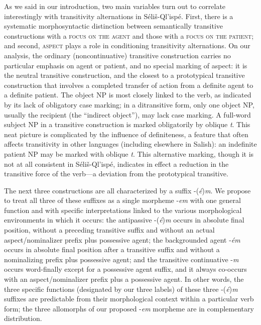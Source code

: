\documentclass[output=paper,colorlinks,citecolor=brown]{langscibook}
\begin{document}
As we said in our introduction, two main variables turn out to
correlate interestingly with transitivity alternations in
S\'eli\v{s}-Ql'isp\'e.  First, there is a systematic morphosyntactic
distinction between semantically transitive constructions with a
\textsc{focus on the agent} and those with a \textsc{focus on the
patient}; and second, \textsc{aspect} plays a role in conditioning
transitivity alternations.  On our analysis, the ordinary
(noncontinuative) transitive construction carries no particular
emphasis on agent or patient, and no special marking of aspect: it is
the neutral transitive construction, and the closest to a prototypical
transitive construction that involves a completed transfer of action
from a definite agent to a definite patient.  The object NP is most
closely linked to the verb, as indicated by its lack of obligatory
case marking; in a ditransitive form, only one object NP, usually the
recipient (the ``indirect object''), may lack case marking.  A
full-word subject NP in a transitive construction is marked
obligatorily by oblique \emph{t}.  This neat picture is complicated by
the influence of definiteness, a feature that often affects
transitivity in other languages (including elsewhere in Salish): an
indefinite patient NP may be marked with oblique \emph{t}.  This
alternative marking, though it is not at all consistent in
S\'eli\v{s}-Ql'isp\'e, indicates in effect a reduction in the
transitive force of the verb---a deviation from the prototypical
transitive.


The next three constructions are all characterized by a suffix
-(\emph{\'e})\emph{m}.  We propose to treat all three of these
suffixes as a single morpheme -\emph{em} with one general function and
with specific interpretations linked to the various morphological
environments in which it occurs: the antipassive -(\emph{\'e})\emph{m}
occurs in absolute final position, without a preceding transitive
suffix and without an actual aspect/nominalizer prefix plus possessive
agent; the backgrounded agent -\emph{\'em} occurs in absolute final
position after a transitive suffix and without a nominalizing prefix
plus possessive agent; and the transitive continuative -\emph{m}
occurs word-finally except for a possessive agent suffix, and it
always co-occurs with an aspect/nominalizer prefix plus a possessive
agent.  In other words, the three specific functions (designated by
our three labels) of these three -(\emph{\'e})\emph{m}  suffixes are
 predictable from their morphological context within a particular
 verb form; the three allomorphs of our proposed -\emph{em}
 morpheme are in complementary distribution.
\end{document}
